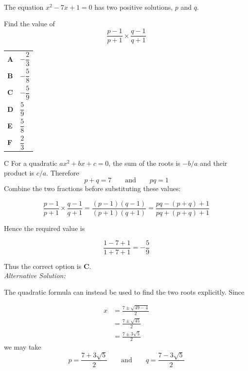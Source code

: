 \documentclass[11pt,a4paper]{article}
\begin{document}
\clearpage
\thispagestyle{djssolutions}
\vspace*{8pt}
\begin{enumerate}[label=\textbf{\arabic*.},leftmargin=*,itemsep=0pt,start=13]
\questionitem[Algebra]
The equation $x^2-7x+1=0$ has two positive solutions, $p$ and $q$.

Find the value of
\[ \frac{p-1}{p+1}\times\frac{q-1}{q+1}\]

\par\vspace*{12pt}
\begin{tabularx}{\linewidth}{@{}>{\bfseries}l Y@{}}
A &
$-\dfrac{2}{3}$
\\[0.8em]
B &
$-\dfrac{5}{8}$
\\[0.8em]
C &
$-\dfrac{5}{9}$
\\[0.8em]
D &
$\dfrac{5}{9}$
\\[0.8em]
E &
$\dfrac{5}{8}$
\\[0.8em]
F &
$\dfrac{2}{3}$
\\
\end{tabularx}

\begin{djsSolution}{C}
For a quadratic $ax^2+bx+c=0$, the sum of the roots is $-b/a$ and their product is $c/a$. Therefore
\[
p+q=7 \qquad\text{and}\qquad pq=1
\]
Combine the two fractions before substituting these values:

\[
\frac{p-1}{p+1}\times\frac{q-1}{q+1}
=\frac{(p-1)(q-1)}{(p+1)(q+1)}
=\frac{pq-(p+q)+1}{pq+(p+q)+1}
\]

Hence the required value is

\[
\frac{1-7+1}{1+7+1}=-\frac{5}{9}
\]

Thus the correct option is \textbf{C}. \\[5pt]

\textit{Alternative Solution:}

The quadratic formula can instead be used to find the two roots explicitly. Since

\begin{align*}
x&=\frac{7\pm\sqrt{49-4}}{2}\\[5pt]
&=\frac{7\pm\sqrt{45}}{2}\\[5pt]
&=\frac{7\pm3\sqrt5}{2}
\end{align*}
we may take
\[
p=\frac{7+3\sqrt5}{2} \qquad\text{and}\qquad q=\frac{7-3\sqrt5}{2}
\]


\end{djsSolution}
\end{enumerate}
\end{document}
